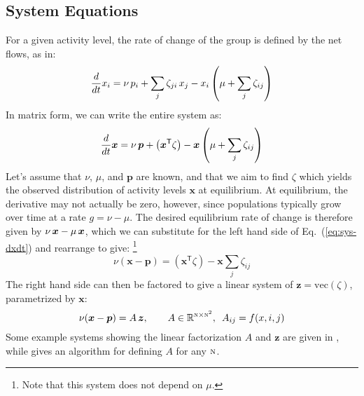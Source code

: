 \documentclass{article}
\newcommand{\N}{\textsc{n}}
\begin{document}
\subsection{System Equations}
For a given activity level, the rate of change of the group is defined by the net flows, as in:
\begin{equation}
  \frac{d}{dt}x_i
= \nu \thinspace p_i + \sum_{j}{\zeta_{ji} \thinspace x_j}
- x_i \left( \mu + \sum_{j}{\zeta_{ij}} \right) %
\end{equation}
In matrix form, we can write the entire system as:
\begin{equation}\label{eq:sys-dxdt}
  \frac{d}{dt}\bm{x}
= \nu \thinspace \bm{p} + \left(\bm{x}^{\mathsf{T}} \zeta\right)
- \bm{x} \left( \mu + \sum_{j}{\zeta_{ij}} \right)
\end{equation}
Let's assume that $\nu$, $\mu$, and $\bm{p}$ are known,
and that we aim to find $\zeta$ which yields
the observed distribution of activity levels $\bm{x}$ at equilibrium.
At equilibrium, the derivative may not actually be zero, however,
since populations typically grow over time at a rate $g = \nu - \mu$.
The desired equilibrium rate of change is therefore given by
$\nu\thinspace\bm{x} - \mu\thinspace\bm{x}$,
which we can substitute for the left hand side of Eq.~(\ref{eq:sys-dxdt})
and rearrange to give:%
\footnote{Note that this system does not depend on $\mu$.}
\begin{equation}
\nu (\bm{x} - \bm{p}) =
\left(\bm{x}^{\mathsf{T}} \zeta\right) - \bm{x} \sum_{j}{\zeta_{ij}}
\end{equation}
The right hand side can then be factored to give
a linear system of $\bm{z} = \mathrm{vec}(\zeta)$, parametrized by $\bm{x}$:
\begin{equation}\label{eq:y=Az}
\nu (\bm{x} - \bm{p}) =
A \thinspace \bm{z}, \qquad
A \in \mathbb{R}^{\N \times \N^2}, \enspace A_{ij} = f(x,i,j)
\end{equation}
Some example systems showing the linear factorization $A$ and $\bm{z}$
are given in ,
while  gives an algorithm for defining $A$ for any $\N$.
\end{document}

